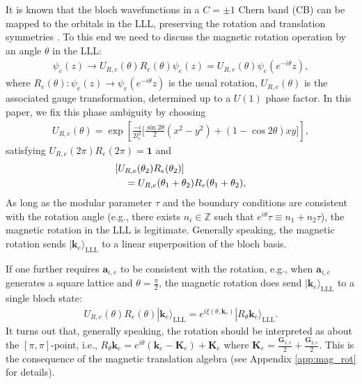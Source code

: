 It is known that the bloch wavefunctions in a $C=\pm 1$ Chern band (CB) can be mapped to the orbitals in the LLL, preserving the rotation and translation symmetries \cite{jian2013crystal}. To this end we need to discuss the magnetic rotation operation by an angle $\theta$ in the LLL:
\begin{align}
    \psi_e(z)\rightarrow U_{R,e}(\theta)R_e(\theta)\psi_e(z)=U_{R,e}(\theta)\psi_e(e^{-i\theta}z),
\end{align}
where $R_e(\theta): \psi_e(z)\rightarrow \psi_e(e^{-i\theta}z)$ is the usual rotation, $U_{R,e}(\theta)$ is the associated gauge transformation, determined up to a $U(1)$ phase factor. In this paper, we fix this phase ambiguity by choosing
\begin{align}
    U_{R,e}(\theta)=\exp\left[\frac{-i}{2l_e^2}\Big[\frac{\sin2\theta}{2}(x^2-y^2)+(1-\cos2\theta)xy\Big]\right],\label{eq:U_R}
\end{align}
satisfying $U_{R,e}(2\pi)R_e(2\pi)=\mathbf 1$ and
\begin{align}
    [U_{R,e}(\theta_1)R_e(\theta_1)] & [U_{R,e}(\theta_2)R_e(\theta_2)]\notag                                         \\
                                     & \quad=U_{R,e}(\theta_1+\theta_2)R_e(\theta_1+\theta_2),\label{eq:U_R_identity}
\end{align}
As long as the modular parameter $\tau$ and the boundary conditions are consistent with the rotation angle (e.g., there exists $n_i\in\mathbb Z$ such that $e^{i\theta}\tau\equiv n_1+n_2\tau$), the magnetic rotation in the LLL is legitimate. Generally speaking, the magnetic rotation sends $|\mathbf k_e\rangle_{\text{LLL}}$ to a linear superposition of the bloch basis.

If one further requires $\mathbf a_{i,e}$ to be consistent with the rotation, e.g., when $\mathbf a_{i,e}$ generates a square lattice and $\theta=\frac{\pi}{2}$, the magnetic rotation does send $|\mathbf k_e\rangle_{\text{LLL}}$ to a single bloch state:
\begin{align}
    U_{R,e}(\theta)R_e(\theta)|\mathbf k_e\rangle_{\text{LLL}}=e^{i \xi(\theta,\mathbf k_e)}|R_{\theta}\mathbf k_e\rangle_{\text{LLL}}.\label{eq:R_trans}
\end{align}
It turns out that, generally speaking, the rotation should be interpreted as about the $[\pi,\pi]$-point, i.e., $R_{\theta}\mathbf k_e=e^{i\theta}(\mathbf k_e-\mathbf K_e)+\mathbf K_e$ where $\mathbf K_e=\frac{\mathbf G_{1,e}}{2}+\frac{\mathbf G_{2,e}}{2}$. This is the consequence of the magnetic translation algebra (see Appendix \ref{app:mag_rot} for details).

